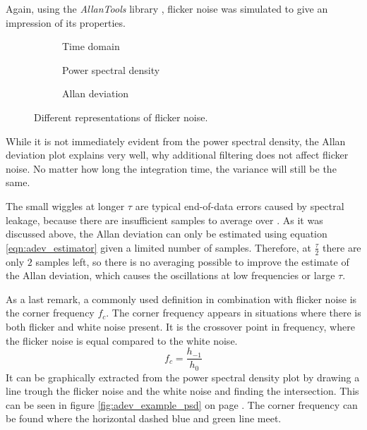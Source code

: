 Again, using the \textit{AllanTools} library \cite{allantools}, flicker noise was simulated to give an impression of its properties.
\begin{figure}[ht]
    \centering
    \begin{subfigure}{0.32\linewidth}
        \centering
        \scalebox{0.75}{%
        } %
        \caption{Time domain}
        \label{fig:flicker_noise_time}
    \end{subfigure}
    \begin{subfigure}{0.32\linewidth}
        \centering
        \scalebox{0.75}{%
        } %
        \caption{Power spectral density}
        \label{fig:flicker_noise_psd}
    \end{subfigure}
    \begin{subfigure}{0.32\linewidth}
        \centering
        \scalebox{0.75}{%
        } %
        \caption{Allan deviation}
        \label{fig:flicker_noise_adev}
    \end{subfigure}
    \caption{Different representations of flicker noise.}
    \label{fig:flicker_noise_simulated}
\end{figure}

While it is not immediately evident from the power spectral density, the Allan deviation plot explains very well, why additional filtering does not affect flicker noise. No matter how long the integration time, the variance will still be the same.

The small wiggles at longer $\tau$ are typical end-of-data errors caused by spectral leakage, because there are insufficient samples to average over \cite{adev_long_tau}. As it was discussed above, the Allan deviation can only be estimated using equation \ref{eqn:adev_estimator} given a limited number of samples. Therefore, at $\frac{\tau}{2}$ there are only $2$ samples left, so there is no averaging possible to improve the estimate of the Allan deviation, which causes the oscillations at low frequencies or large $\tau$.

As a last remark, a commonly used definition in combination with flicker noise is the corner frequency $f_c$. The corner frequency appears in situations where there is both flicker and white noise present. It is the crossover point in frequency, where the flicker noise is equal compared to the white noise.
\begin{equation}
    f_c = \frac{h_{-1}}{h_0} \label{eqn:corner_frequency}
\end{equation}
It can be graphically extracted from the power spectral density plot by drawing a line trough the flicker noise and the white noise and finding the intersection. This can be seen in figure \ref{fig:adev_example_psd} on page \pageref{fig:adev_example_psd}. The corner frequency can be found where the horizontal dashed blue and green line meet.

